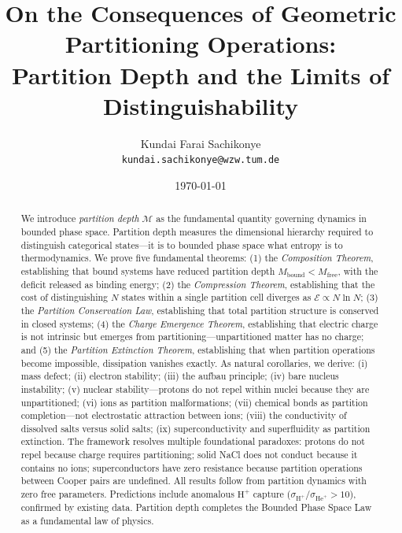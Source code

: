 \documentclass[twocolumn,10pt,a4paper]{article}
\theoremstyle{definition}
\theoremstyle{remark}
\newcommand{\Partition}{\mathcal{P}}
\newcommand{\Depth}{\mathcal{M}}
\newcommand{\Cost}{\mathcal{E}}
\newcommand{\Mfree}{M_{\mathrm{free}}}
\newcommand{\Mbound}{M_{\mathrm{bound}}}
\begin{document}
\title{\textbf{On the Consequences of Geometric Partitioning Operations:\\Partition Depth and the Limits of Distinguishability}}

\author{
Kundai Farai Sachikonye\\
\texttt{kundai.sachikonye@wzw.tum.de}
}

\date{\today}

\maketitle

\begin{abstract}
\noindent We introduce \emph{partition depth} $\Depth$ as the fundamental quantity governing dynamics in bounded phase space. Partition depth measures the dimensional hierarchy required to distinguish categorical states---it is to bounded phase space what entropy is to thermodynamics. We prove five fundamental theorems: (1) the \emph{Composition Theorem}, establishing that bound systems have reduced partition depth $\Mbound < \Mfree$, with the deficit released as binding energy; (2) the \emph{Compression Theorem}, establishing that the cost of distinguishing $N$ states within a single partition cell diverges as $\Cost \propto N\ln N$; (3) the \emph{Partition Conservation Law}, establishing that total partition structure is conserved in closed systems; (4) the \emph{Charge Emergence Theorem}, establishing that electric charge is not intrinsic but emerges from partitioning---unpartitioned matter has no charge; and (5) the \emph{Partition Extinction Theorem}, establishing that when partition operations become impossible, dissipation vanishes exactly. As natural corollaries, we derive: (i) mass defect; (ii) electron stability; (iii) the aufbau principle; (iv) bare nucleus instability; (v) nuclear stability---protons do not repel within nuclei because they are unpartitioned; (vi) ions as partition malformations; (vii) chemical bonds as partition completion---not electrostatic attraction between ions; (viii) the conductivity of dissolved salts versus solid salts; (ix) superconductivity and superfluidity as partition extinction. The framework resolves multiple foundational paradoxes: protons do not repel because charge requires partitioning; solid NaCl does not conduct because it contains no ions; superconductors have zero resistance because partition operations between Cooper pairs are undefined. All results follow from partition dynamics with zero free parameters. Predictions include anomalous $\text{H}^+$ capture ($\sigma_{\text{H}^+}/\sigma_{\text{He}^+} > 10$), confirmed by existing data. Partition depth completes the Bounded Phase Space Law as a fundamental law of physics.
\end{abstract}
\end{document}
